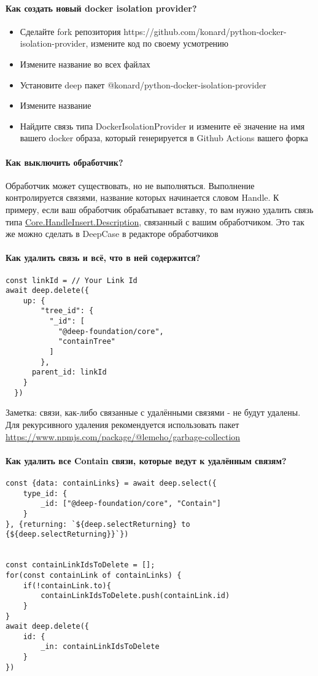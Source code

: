 \paragraph{Как создать новый docker isolation provider?}
\begin{itemize}
      \item Сделайте fork репозитория https://github.com/konard/python-docker-isolation-provider, измените код по своему усмотрению
      \item Измените название во всех файлах
      \item Установите deep пакет @konard/python-docker-isolation-provider
      \item Измените название
      \item Найдите связь типа DockerIsolationProvider и измените её значение на имя вашего docker образа, который генерируется в Github Actions вашего форка
\end{itemize}
\paragraph{Как выключить обработчик?}
Обработчик может существовать, но не выполняться. Выполнение контролируется связями, название которых начинается словом Handle. К примеру, если ваш обработчик обрабатывает вставку, то вам нужно удалить связь типа \hyperlink{HandleInsert}{Core.HandleInsert.Description}, связанный с вашим обработчиком. Это так же можно сделать в DeepCase в редакторе обработчиков
\paragraph{Как удалить связь и всё, что в ней содержится?}
\begin{verbatim}
const linkId = // Your Link Id
await deep.delete({
    up: {
        "tree_id": {
          "_id": [
            "@deep-foundation/core",
            "containTree"
          ]
        },
      parent_id: linkId
    }
  })
\end{verbatim}
Заметка: связи, как-либо связанные с удалёнными связями - не будут удалены. Для рекурсивного удаления рекомендуется использовать пакет \href{@lemeho/garbage-collection}{https://www.npmjs.com/package/@lemeho/garbage-collection}
\paragraph{Как удалить все Contain связи, которые ведут к удалённым связям?}
\begin{verbatim}
const {data: containLinks} = await deep.select({
    type_id: {
        _id: ["@deep-foundation/core", "Contain"]
    }
}, {returning: `${deep.selectReturning} to {${deep.selectReturning}}`})


const containLinkIdsToDelete = [];
for(const containLink of containLinks) {
    if(!containLink.to){
        containLinkIdsToDelete.push(containLink.id)
    }
}
await deep.delete({
    id: {
        _in: containLinkIdsToDelete
    }
})
\end{verbatim}

